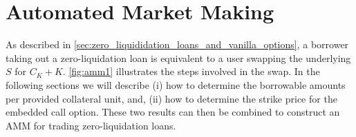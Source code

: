 \documentclass[a4paper]{article}
\begin{document}

\section{Automated Market Making}
\label{sec:AMM}
As described in \cref{sec:zero_liquididation_loans_and_vanilla_options}, a borrower taking out a zero-liquidation loan is equivalent to a user swapping the underlying $S$ for $C_K+K$. \cref{fig:amm1} illustrates the steps involved in the swap. In the following sections we will describe (i) how to determine the borrowable amounts per provided collateral unit, and, (ii) how to determine the strike price for the embedded call option. These two results can then be combined to construct an AMM for trading zero-liquidation loans.

\end{document}
